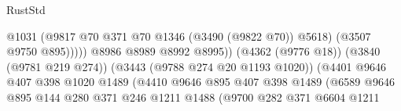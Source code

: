 \begin{lexlean}{RustStd}
\begin{coremodule}
                                                            @1031
                                                            (@9817
                                                              @70
                                                              @371
                                                              @70
                                                              @1346
                                                              (@3490 (@9822 @70))
                                                              @5618)
                                                            (@3507 @9750 @895)))))
                                                    @8986
                                                    @8989
                                                    @8992
                                                    @8995))
                                                (@4362 (@9776 @18))
                                                (@3840 (@9781 @219 @274))
                                                (@3443 (@9788 @274 @20 @1193 @1020))
                                                (@4401
                                                  @9646
                                                  @407
                                                  @398
                                                  @1020
                                                  @1489
                                                  (@4410
                                                    @9646
                                                    @895
                                                    @407
                                                    @398
                                                    @1489
                                                    (@6589
                                                      @9646
                                                      @895
                                                      @144
                                                      @280
                                                      @371
                                                      @246
                                                      @1211
                                                      @1488
                                                      (@9700
                                                        @282
                                                        @371
                                                        @6604
                                                        @1211

\end{coremodule}
\end{lexlean}
